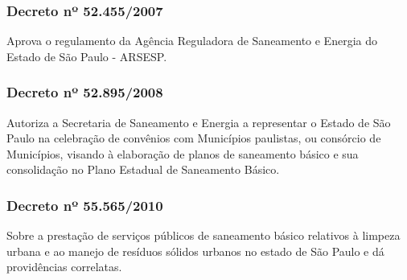 \begin{subapend}
\begin{subsubapend}
		\subsubsection{Decreto nº 52.455/2007}
		Aprova o regulamento da Agência Reguladora de Saneamento e Energia do Estado de São Paulo - ARSESP.
		\subsubsection{Decreto nº 52.895/2008}
		Autoriza a Secretaria de Saneamento e Energia a representar o Estado de São Paulo na celebração de convênios com Municípios paulistas, ou consórcio de Municípios, visando à elaboração de planos de saneamento básico e sua consolidação no Plano Estadual de Saneamento Básico.
		\subsubsection{Decreto nº 55.565/2010}
		Sobre a prestação de serviços públicos de saneamento básico relativos à limpeza urbana e ao manejo de resíduos sólidos urbanos no estado de São Paulo e dá providências correlatas.
	\end{subsubapend}
\end{subapend}

